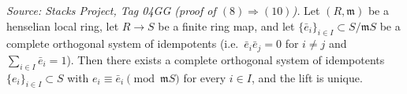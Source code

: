 \begin{lemma}
  \label{lem:lift-complete-orthogonal-idempotents-henselian}
  \textit{Source: Stacks Project, Tag 04GG (proof of
  $(8) \Rightarrow (10)$).}
  Let $(R, \mathfrak m)$ be a henselian local ring, let $R \to S$ be
  a finite ring map, and let $\{\bar e_i\}_{i \in I} \subset
  S/\mathfrak m S$ be a complete orthogonal system of idempotents
  (i.e.\ $\bar e_i \bar e_j = 0$ for $i \ne j$ and
  $\sum_{i \in I} \bar e_i = 1$). Then there exists a complete
  orthogonal system of idempotents $\{e_i\}_{i \in I} \subset S$ with
  $e_i \equiv \bar e_i \pmod{\mathfrak m S}$ for every $i \in I$, and
  the lift is unique.
\end{lemma}

